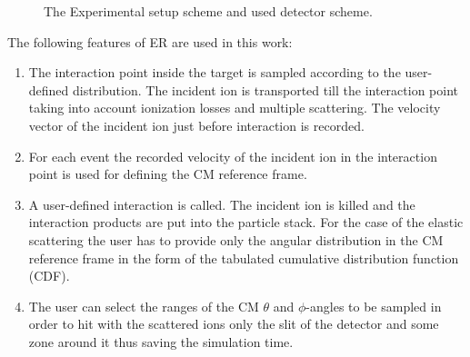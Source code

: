 \documentclass[%
 aip,
cp,  %
 amsmath,amssymb,%
 reprint,%
]{revtex4-2}
\begin{document}
\begin{figure}[h]
\caption{The Experimental setup scheme and used detector scheme.}
\label{ris:fig1}
\end{figure}


The following features of ER are used in this work:
\begin{enumerate}
\item The interaction point inside the target is sampled according to the user-defined distribution. The incident ion is transported till the interaction point taking into account ionization losses and multiple scattering. The velocity vector of the incident ion just before interaction is recorded.
\item For each event the recorded velocity of the incident ion in the interaction point is used for defining the CM reference frame.
\item A user-defined interaction is called. The incident ion is killed and the interaction products are put into the particle stack. For the case of the elastic scattering the user has to provide only the angular distribution in the CM reference frame in the form of the tabulated cumulative distribution function (CDF).
\item The user can select the ranges of the CM $\theta$ and $\phi$-angles to be sampled in order to hit with the scattered ions only the slit of the detector and some zone around it thus saving the simulation time.
\end{enumerate}
\end{document}

